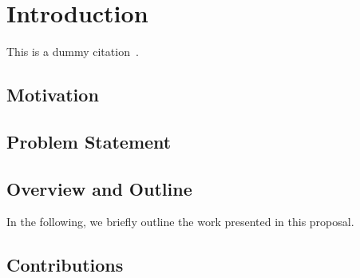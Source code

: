 \chapter{Introduction}
\label{chap:introduction}

\lipsum

This is a dummy citation~\cite{dummy}.

\section{Motivation}
\label{sec:intro:motivation}


\section{Problem Statement}
\label{sec:intro:problem}

\section{Overview and Outline}
\label{sec:intro:overview}

In the following, we briefly outline the work presented in this proposal. 


\section{Contributions}
\label{sec:intro:contributions}

